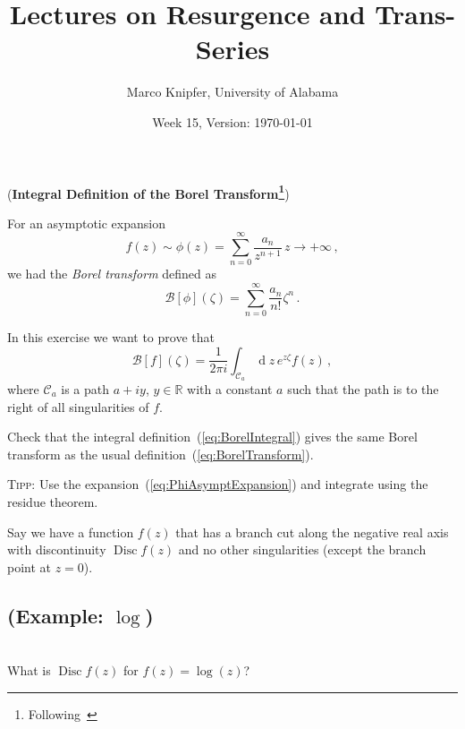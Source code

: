 \documentclass{exam}
\title{Lectures on Resurgence and Trans-Series}
\author{Marco Knipfer, University of Alabama}
\date{Week 15, Version: \today}
\DeclareMathOperator{\diff}{d}
\DeclareMathOperator*{\Disc}{Disc}
\newcommand{\calB}{\mathcal{B}}
\begin{document}
\maketitle

\begin{questions}
    \setcounter{question}{10}
    \question (\textbf{Integral Definition of the Borel Transform\footnote{Following~\cite{Mas:2019dhl}}})

    For an asymptotic expansion
    \begin{equation}
        f(z) \sim \phi(z) = \sum_{n=0}^\infty \frac{a_n}{z^{n+1}}\, z\to+\infty\,,
        \label{eq:PhiAsymptExpansion}
    \end{equation}
    we had the \textit{Borel transform} defined as
    \begin{equation}
        \calB[\phi](\zeta) = \sum_{n=0}^\infty \frac{a_n}{n!} \zeta^n\,.
        \label{eq:BorelTransform}
    \end{equation}

    In this exercise we want to prove that
    \begin{equation}
        \calB[f](\zeta) = \frac{1}{2\pi i} \int_{\mathcal{C}_a} \diff\!z\, e^{z \zeta} f(z)\,,
        \label{eq:BorelIntegral}
    \end{equation}
    where $\mathcal{C}_a$ is a path $a+iy$, $y\in\mathbb{R}$ with a constant $a$ such that the path is to the right
    of all singularities of $f$.

    Check that the integral definition~(\ref{eq:BorelIntegral}) gives the same Borel transform as the usual
    definition~(\ref{eq:BorelTransform}).

    \textsc{Tipp}: Use the expansion~(\ref{eq:PhiAsymptExpansion}) and integrate using the residue theorem.

    \label{q:Cauchy}
    
    Say we have a function $f(z)$ that has a branch cut along the negative real axis with discontinuity $\Disc f(z)$
    and no other singularities (except the branch point at $z=0$).
    \begin{parts}
        \part{(Example: $\log$)}\\
        What is $\Disc f(z)$ for $f(z) = \log(z)$?


\end{parts}
\end{questions}
\end{document}
